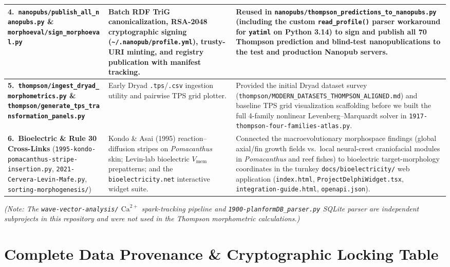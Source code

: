 \documentclass[10.5pt,a4paper]{article}
\newcommand{\code}[1]{{\footnotesize\nolinkurl{#1}}}
\begin{document}
{\begin{tabularx}{\textwidth}{L{1.5in} L{1.55in} Y}
\midrule
\textbf{4.\ \code{nanopubs/publish_all_nanopubs.py} \& \code{morphoeval/sign_morphoeval.py}} &
Batch RDF TriG canonicalization, RSA-2048 cryptographic signing (\code{~/.nanopub/profile.yml}), trusty-URI minting, and registry publication with manifest tracking. &
Reused in \code{nanopubs/thompson_predictions_to_nanopubs.py} (including the custom \code{read_profile()} parser workaround for \texttt{yatiml} on Python 3.14) to sign and publish all 70 Thompson prediction and blind-test nanopublications to the test and production Nanopub servers. \\
\midrule
\textbf{5.\ \code{thompson/ingest_dryad_morphometrics.py} \& \code{thompson/generate_tps_transformation_panels.py}} &
Early Dryad \texttt{.tps}/\texttt{.csv} ingestion utility and pairwise TPS grid plotter. &
Provided the initial Dryad dataset survey (\code{thompson/MODERN_DATASETS_THOMPSON_ALIGNED.md}) and baseline TPS grid visualization scaffolding before we built the full 4-family nonlinear Levenberg--Marquardt solver in \code{1917-thompson-four-families-atlas.py}. \\
\midrule
\textbf{6.\ Bioelectric \& Rule 30 Cross-Links} (\code{1995-kondo-pomacanthus-stripe-insertion.py}, \code{2021-Cervera-Levin-Mafe.py}, \code{sorting-morphogenesis/}) &
Kondo \& Asai (1995) reaction--diffusion stripes on \emph{Pomacanthus} skin; Levin-lab bioelectric $V_{\mathrm{mem}}$ prepatterns; and the \code{bioelectricity.net} interactive widget suite. &
Connected the macroevolutionary morphospace findings (global axial/fin growth fields vs.\ local neural-crest craniofacial modules in \emph{Pomacanthus} and reef fishes) to bioelectric target-morphology coordinates in the turnkey \code{docs/bioelectricity/} web application (\code{index.html}, \code{ProjectDelphiWidget.tsx}, \code{integration-guide.html}, \code{openapi.json}). \\
\bottomrule
\end{tabularx}
}

\vspace{0.3em}
\emph{(Note: The \code{wave-vector-analysis/} $\mathrm{Ca}^{2+}$ spark-tracking pipeline and \code{1900-planformDB_parser.py} SQLite parser are independent subprojects in this repository and were not used in the Thompson morphometric calculations.)}

\section{Complete Data Provenance \& Cryptographic Locking Table}
\end{document}
